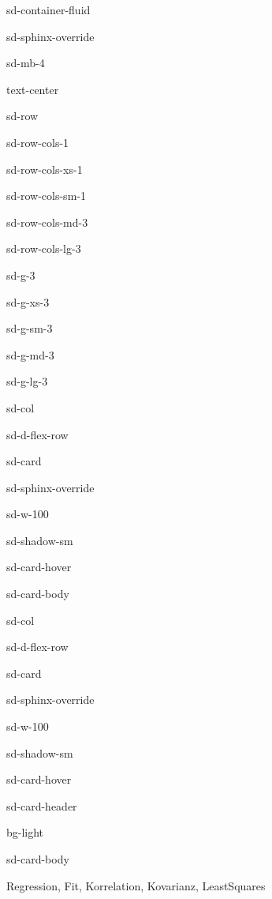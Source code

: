 \documentclass[letterpaper,10pt,english]{jupyterBook}
\let\sphinxpxdimen\pdfpxdimen\else\newdimen\sphinxpxdimen
\begin{document}
\begin{sphinxuseclass}{sd-container-fluid}
\begin{sphinxuseclass}{sd-sphinx-override}
\begin{sphinxuseclass}{sd-mb-4}
\begin{sphinxuseclass}{text-center}
\begin{sphinxuseclass}{sd-row}
\begin{sphinxuseclass}{sd-row-cols-1}
\begin{sphinxuseclass}{sd-row-cols-xs-1}
\begin{sphinxuseclass}{sd-row-cols-sm-1}
\begin{sphinxuseclass}{sd-row-cols-md-3}
\begin{sphinxuseclass}{sd-row-cols-lg-3}
\begin{sphinxuseclass}{sd-g-3}
\begin{sphinxuseclass}{sd-g-xs-3}
\begin{sphinxuseclass}{sd-g-sm-3}
\begin{sphinxuseclass}{sd-g-md-3}
\begin{sphinxuseclass}{sd-g-lg-3}
\begin{sphinxuseclass}{sd-col}
\begin{sphinxuseclass}{sd-d-flex-row}
\begin{sphinxuseclass}{sd-card}
\begin{sphinxuseclass}{sd-sphinx-override}
\begin{sphinxuseclass}{sd-w-100}
\begin{sphinxuseclass}{sd-shadow-sm}
\begin{sphinxuseclass}{sd-card-hover}
\begin{sphinxuseclass}{sd-card-body}
\end{sphinxuseclass}{\hyperref[\detokenize{content/1_Messunsicherheiten::doc}]{}}
\end{sphinxuseclass}
\end{sphinxuseclass}
\end{sphinxuseclass}
\end{sphinxuseclass}
\end{sphinxuseclass}
\end{sphinxuseclass}
\end{sphinxuseclass}
\begin{sphinxuseclass}{sd-col}
\begin{sphinxuseclass}{sd-d-flex-row}
\begin{sphinxuseclass}{sd-card}
\begin{sphinxuseclass}{sd-sphinx-override}
\begin{sphinxuseclass}{sd-w-100}
\begin{sphinxuseclass}{sd-shadow-sm}
\begin{sphinxuseclass}{sd-card-hover}
\begin{sphinxuseclass}{sd-card-header}
\begin{sphinxuseclass}{bg-light}
\sphinxAtStartPar
{}

\end{sphinxuseclass}
\end{sphinxuseclass}
\begin{sphinxuseclass}{sd-card-body}
\noindent\sphinxincludegraphics[height=120\sphinxpxdimen]{{regression}.png}

\sphinxAtStartPar
Regression, Fit, Korrelation, Kovarianz, Least\sphinxhyphen{}Squares


\end{sphinxuseclass}
\end{sphinxuseclass}
\end{sphinxuseclass}
\end{sphinxuseclass}
\end{sphinxuseclass}
\end{sphinxuseclass}
\end{sphinxuseclass}
\end{sphinxuseclass}
\end{sphinxuseclass}
\end{sphinxuseclass}
\end{sphinxuseclass}
\end{sphinxuseclass}
\end{sphinxuseclass}
\end{sphinxuseclass}
\end{sphinxuseclass}
\end{sphinxuseclass}
\end{sphinxuseclass}
\end{sphinxuseclass}
\end{sphinxuseclass}
\end{sphinxuseclass}
\end{sphinxuseclass}
\end{sphinxuseclass}
\end{sphinxuseclass}
\end{document}

